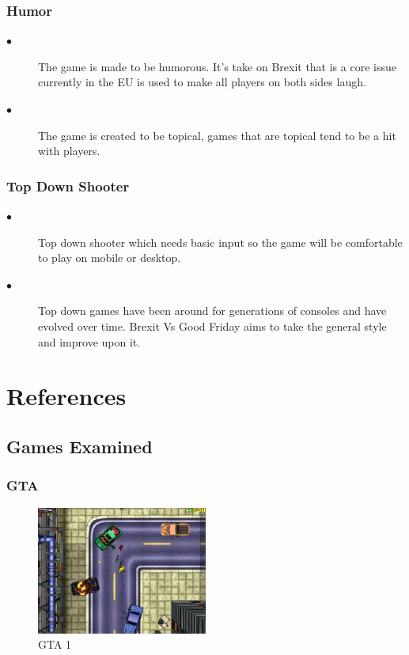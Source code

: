 \documentclass[a4paper]{scrreprt}
\begin{document}
        \subsection{Humor}
            \begin{description}
                \item[$\bullet$] The game is made to be humorous. It's take on Brexit that is a core issue currently in the EU is used to make all players on both sides laugh.
                \item[$\bullet$] The game is created to be topical, games that are topical tend to be a hit with players.
            \end{description}

        \subsection{Top Down Shooter}
            \begin{description}
                \item[$\bullet$] Top down shooter which needs basic input so the game will be comfortable to play on mobile or desktop.
                \item[$\bullet$] Top down games have been around for generations of consoles and have evolved over time. Brexit Vs Good Friday aims to take the general style and improve upon it.
            \end{description}

    \chapter{References} 

    \section{Games Examined}

        \subsection{GTA}

            \begin{figure}[H]
                \centering
                \includegraphics[width=0.5\textwidth]{gta1.jpg}
                \caption{\label{fig:art} GTA 1}
            \end{figure}
\end{document}
